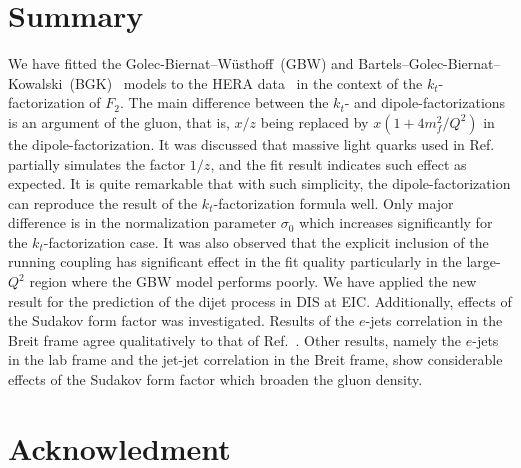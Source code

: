 \documentclass[12pt]{article}
\numberwithin{equation}{section}
\numberwithin{table}{section}
\numberwithin{figure}{section}
\begin{document}
\section{Summary}
We have fitted the Golec-Biernat--W\"usthoff~(GBW)\cite{Golec-Biernat:1998zce} and Bartels--Golec-Biernat--Kowalski~(BGK)~\cite{Bartels:2002cj} models to the HERA data~\cite{Abt:2017nkc} in the context of the $k_t$-factorization of $F_2$.  The main difference between the $k_t$- and dipole-factorizations is an argument of the gluon, that is, $x/z$ being replaced by $x(1+4m_f^2/Q^2)$ in the dipole-factorization. It was discussed that massive light quarks used in Ref.~\cite{Golec-Biernat:1998zce} partially simulates the factor $1/z$, and the fit result indicates such effect as expected. It is quite remarkable that with such simplicity, the dipole-factorization can reproduce the result of the $k_t$-factorization formula well. Only major difference is in the normalization parameter $\sigma_0$ which increases significantly for the $k_t$-factorization case. It was also observed that the explicit inclusion of the running coupling has significant effect in the fit quality particularly in the large-$Q^2$ region where the GBW model performs poorly. 
We have applied the new result for the prediction of the dijet process in DIS at EIC. Additionally, effects of the Sudakov form factor was investigated. Results of the $e$-jets correlation in the Breit frame agree qualitatively to that of Ref.~\cite{vanHameren:2021sqc}. Other results, namely the $e$-jets in the lab frame and the jet-jet correlation in the Breit frame, show considerable effects of the Sudakov form factor which broaden the gluon density.  

\section*{Acknowledment}


\clearpage
%
\printbibliography

% 

%
\end{document}

